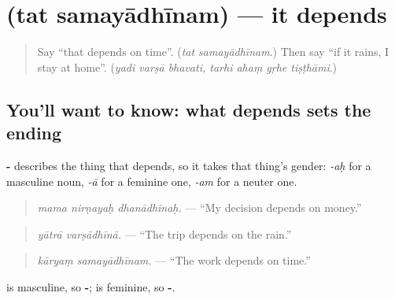 \section[\texorpdfstring{\sk{तत्} \sk{समयाधीनम्} (tat samayādhīnam)}{तत् समयाधीनम् (tat samayādhīnam)}]{  (tat samayādhīnam) — it depends}

\label{lesson:SA-C285-samayadhinam}



\begin{quote}
Say \textquotedblleft{}that depends on time\textquotedblright{}. (\emph{tat samayādhīnam}.) Then say \textquotedblleft{}if it rains, I stay at home\textquotedblright{}. (\emph{yadi varṣā bhavati, tarhi ahaṃ gṛhe tiṣṭhāmi}.)
\end{quote}

\subsection*{You'll want to know: what depends sets the ending}
\textbf{-} describes the thing that depends, so it takes that thing's gender: \emph{-aḥ} for a masculine noun, \emph{-ā} for a feminine one, \emph{-am} for a neuter one.

\begin{quote}
\textbf{  }
\end{quote}

\begin{quote}
\emph{mama nirṇayaḥ dhanādhīnaḥ.} — \textquotedblleft{}My decision depends on money.\textquotedblright{}
\end{quote}

\begin{quote}
\textbf{ }
\end{quote}

\begin{quote}
\emph{yātrā varṣādhīnā.} — \textquotedblleft{}The trip depends on the rain.\textquotedblright{}
\end{quote}

\begin{quote}
\textbf{ }
\end{quote}

\begin{quote}
\emph{kāryaṃ samayādhīnam.} — \textquotedblleft{}The work depends on time.\textquotedblright{}
\end{quote}

\textbf{} is masculine, so \textbf{-}; \textbf{} is feminine, so \textbf{-}.

